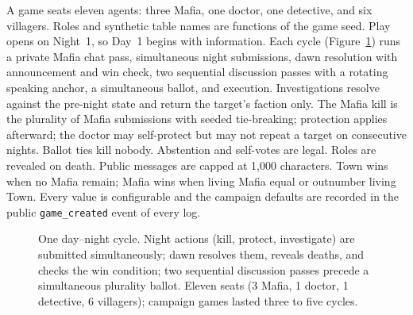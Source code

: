 \documentclass[11pt]{article}
\newcommand{\code}[1]{\texttt{#1}}
\begin{document}
A game seats eleven agents: three Mafia, one doctor, one detective, and six villagers. Roles and synthetic table names are functions of the game seed. Play opens on Night~1, so Day~1 begins with information. Each cycle (Figure~\ref{fig:cycle}) runs a private Mafia chat pass, simultaneous night submissions, dawn resolution with announcement and win check, two sequential discussion passes with a rotating speaking anchor, a simultaneous ballot, and execution. Investigations resolve against the pre-night state and return the target's faction only. The Mafia kill is the plurality of Mafia submissions with seeded tie-breaking; protection applies afterward; the doctor may self-protect but may not repeat a target on consecutive nights. Ballot ties kill nobody. Abstention and self-votes are legal. Roles are revealed on death. Public messages are capped at 1,000 characters. Town wins when no Mafia remain; Mafia wins when living Mafia equal or outnumber living Town. Every value is configurable and the campaign defaults are recorded in the public \code{game\_created} event of every log.

\begin{figure}[t]
\centering
{}
\caption{One day--night cycle. Night actions (kill, protect, investigate) are submitted simultaneously; dawn resolves them, reveals deaths, and checks the win condition; two sequential discussion passes precede a simultaneous plurality ballot. Eleven seats (3 Mafia, 1 doctor, 1 detective, 6 villagers); campaign games lasted three to five cycles.}
\label{fig:cycle}
\end{figure}
\end{document}
